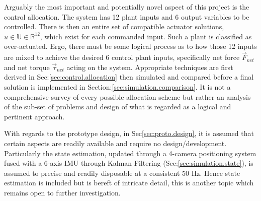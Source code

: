 \par
Arguably the most important and potentially novel aspect of this project is the control allocation. The system has 12 plant inputs and 6 output variables to be controlled. There is then an entire set of compatible actuator solutions, $u\in\mathbb{U}\in\mathbb{R}^{12}$, which exist for each commanded input. Such a plant is classified as over-actuated. Ergo, there must be some logical process as to how those 12 inputs are mixed to achieve the desired 6 control plant inputs, specifically net force $\vec{F}_{net}$ and net torque $\vec{\tau}_{net}$ acting on the system. Appropriate techniques are first derived in Sec:\ref{sec:control.allocation} then simulated and compared before a final solution is implemented in Section:\ref{sec:simulation.comparison}. It is not a comprehensive survey of every possible allocation scheme but rather an analysis of the sub-set of problems and design of what is regarded as a logical and pertinent approach.
\par
With regards to the prototype design, in Sec\ref{sec:proto.design}, it is assumed that certain aspects are readily available and require no design/development. Particularly the state estimation, updated through a 4-camera positioning system fused with a 6-axis IMU through Kalman Filtering (Sec:\ref{sec:simulation.state}), is assumed to precise and readily disposable at a consistent 50 Hz. Hence state estimation is included but is bereft of intricate detail, this is another topic which remains open to further investigation.
